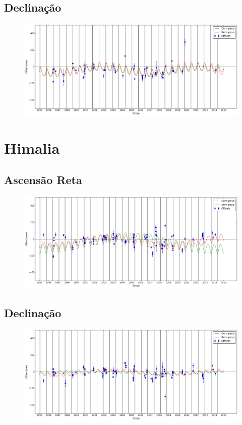 \documentclass[11pt,a4paper]{report}
\begin{document}
\section*{Declinação}

\begin{figure}[h]
\includegraphics[scale=0.35]{Elara/DEC.png} 
\end{figure}

\chapter*{Himalia}
\section*{Ascensão Reta}

\begin{figure}[h]
\includegraphics[scale=0.35]{Himalia/RA.png} 
\end{figure}

\section*{Declinação}

\begin{figure}[h]
\includegraphics[scale=0.35]{Himalia/DEC.png} 
\end{figure}
\end{document}
